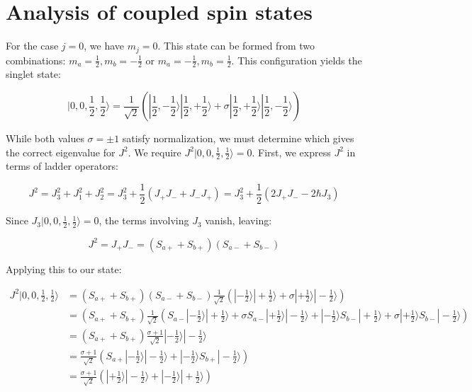 \section{Analysis of coupled spin states}
For the case $j=0$, we have $m_j=0$. This state can be formed from two combinations: $m_a=\frac{1}{2}, m_b=-\frac{1}{2}$ or $m_a=-\frac{1}{2}, m_b=\frac{1}{2}$. This configuration yields the singlet state:

\begin{equation}
|0,0,\frac{1}{2},\frac{1}{2}\rangle=\frac{1}{\sqrt{2}}(|\frac{1}{2},-\frac{1}{2}\rangle|\frac{1}{2},+\frac{1}{2}\rangle+\sigma|\frac{1}{2},+\frac{1}{2}\rangle|\frac{1}{2},-\frac{1}{2}\rangle)
\end{equation}

While both values $\sigma=\pm 1$ satisfy normalization, we must determine which gives the correct eigenvalue for $J^2$. We require $J^2|0,0,\frac{1}{2},\frac{1}{2}\rangle=0$. First, we express $J^2$ in terms of ladder operators:

\begin{equation}
J^{2}=J_{3}^{2}+J_{1}^{2}+J_{2}^{2}=J_{3}^{2}+\frac{1}{2}(J_{+}J_{-}+J_{-}J_{+})=J_{3}^{2}+\frac{1}{2}(2J_{+}J_{-}-2\hbar J_{3})
\end{equation}

Since $J_3|0,0,\frac{1}{2},\frac{1}{2}\rangle=0$, the terms involving $J_3$ vanish, leaving:

\begin{equation}
J^{2}=J_{+}J_{-}=(S_{a+}+S_{b+})(S_{a-}+S_{b-})
\end{equation}

Applying this to our state:

\begin{align}
J^{2}|0,0,\frac{1}{2},\frac{1}{2}\rangle &= (S_{a+}+S_{b+})(S_{a-}+S_{b-}) \frac{1}{\sqrt{2}}(|-\frac{1}{2}\rangle|+\frac{1}{2}\rangle+\sigma|+\frac{1}{2}\rangle|-\frac{1}{2}\rangle) \\
&= (S_{a+}+S_{b+}) \frac{1}{\sqrt{2}}(S_{a-}|-\frac{1}{2}\rangle|+\frac{1}{2}\rangle+\sigma S_{a-}|+\frac{1}{2}\rangle|-\frac{1}{2}\rangle+|-\frac{1}{2}\rangle S_{b-}|+\frac{1}{2}\rangle+\sigma|+\frac{1}{2}\rangle S_{b-}|-\frac{1}{2}\rangle) \\
&= (S_{a+}+S_{b+}) \frac{\sigma+1}{\sqrt{2}}|-\frac{1}{2}\rangle|-\frac{1}{2}\rangle \\
&= \frac{\sigma+1}{\sqrt{2}}(S_{a+}|-\frac{1}{2}\rangle|-\frac{1}{2}\rangle+|-\frac{1}{2}\rangle S_{b+}|-\frac{1}{2}\rangle) \\
&= \frac{\sigma+1}{\sqrt{2}}(|+\frac{1}{2}\rangle|-\frac{1}{2}\rangle+|-\frac{1}{2}\rangle|+\frac{1}{2}\rangle)
\end{align}

